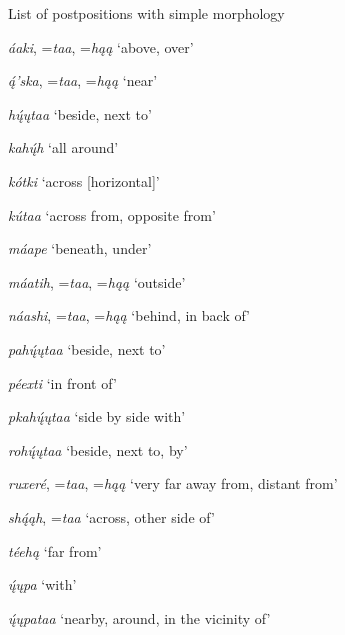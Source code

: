 \begin{exe}

\item\label{ListOfPostpositions} List of postpositions with simple morphology

\begin{xlist}
\item \textit{áaki}, =\textit{taa}, =\textit{hąą} `above, over'

\item \textit{ą́'ska}, =\textit{taa}, =\textit{hąą} `near'

\item \textit{hų́ųtaa} `beside, next to'

\item \textit{kahų́h} `all around'

\item \textit{kótki} `across [horizontal]'

\item \textit{kútaa} `across from, opposite from'

\item \textit{máape} `beneath, under'

\item \textit{máatih}, =\textit{taa}, =\textit{hąą} `outside'

\item \textit{náashi}, =\textit{taa}, =\textit{hąą} `behind, in back of'

\item \textit{pahų́ųtaa} `beside, next to'

\item \textit{péexti} `in front of'

\item \textit{pkahų́ųtaa} `side by side with'

\item \textit{rohų́ųtaa} `beside, next to, by'

\item \textit{ruxeré}, =\textit{taa}, =\textit{hąą} `very far away from, distant from'

\item \textit{shą́ąh}, =\textit{taa} `across, other side of'

\item \textit{téehą} `far from'

\item \textit{ų́ųpa} `with'

\item \textit{ų́ųpataa} `nearby, around, in the vicinity of'


\end{xlist}
\end{exe}
